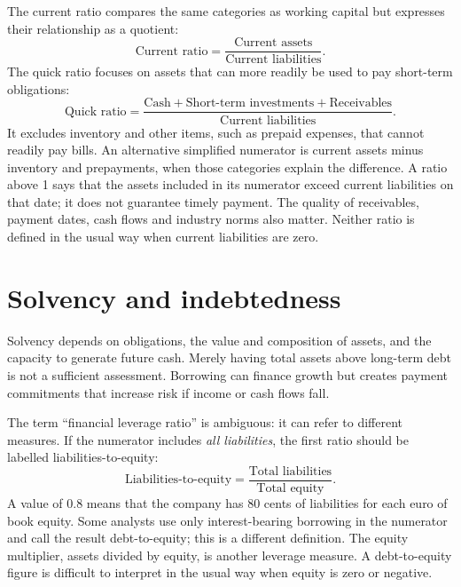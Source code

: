 \documentclass[12pt,a4paper]{report}
\begin{document}
The current ratio compares the same categories as working capital but expresses their relationship as a quotient:
\begin{equation*}
\text{Current ratio}=\frac{\text{Current assets}}{\text{Current liabilities}}.
\end{equation*}
The quick ratio focuses on assets that can more readily be used to pay short-term obligations:
\begin{equation*}
\text{Quick ratio}=\frac{\text{Cash}+\text{Short-term investments}+\text{Receivables}}{\text{Current liabilities}}.
\end{equation*}
It excludes inventory and other items, such as prepaid expenses, that cannot readily pay bills. An alternative simplified numerator is current assets minus inventory and prepayments, when those categories explain the difference. A ratio above 1 says that the assets included in its numerator exceed current liabilities on that date; it does not guarantee timely payment. The quality of receivables, payment dates, cash flows and industry norms also matter. Neither ratio is defined in the usual way when current liabilities are zero.

\section{Solvency and indebtedness}

Solvency depends on obligations, the value and composition of assets, and the capacity to generate future cash. Merely having total assets above long-term debt is not a sufficient assessment. Borrowing can finance growth but creates payment commitments that increase risk if income or cash flows fall.

The term ``financial leverage ratio'' is ambiguous: it can refer to different measures. If the numerator includes \emph{all liabilities}, the first ratio should be labelled liabilities-to-equity:
\begin{equation*}
\text{Liabilities-to-equity}=\frac{\text{Total liabilities}}{\text{Total equity}}.
\end{equation*}
A value of 0.8 means that the company has 80 cents of liabilities for each euro of book equity. Some analysts use only interest-bearing borrowing in the numerator and call the result debt-to-equity; this is a different definition. The equity multiplier, assets divided by equity, is another leverage measure. A debt-to-equity figure is difficult to interpret in the usual way when equity is zero or negative.
\end{document}
